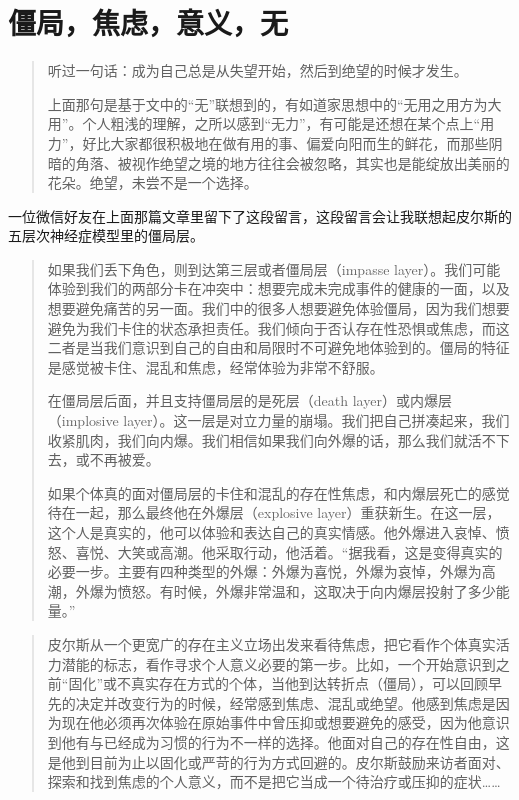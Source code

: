 \chapter{僵局，焦虑，意义，无}






\blockquote{
    听过一句话：成为自己总是从失望开始，然后到绝望的时候才发生。

    上面那句是基于文中的“无”联想到的，有如道家思想中的“无用之用方为大用”。个人粗浅的理解，之所以感到“无力”，有可能是还想在某个点上“用力”，好比大家都很积极地在做有用的事、偏爱向阳而生的鲜花，而那些阴暗的角落、被视作绝望之境的地方往往会被忽略，其实也是能绽放出美丽的花朵。绝望，未尝不是一个选择。
}


一位微信好友在上面那篇文章里留下了这段留言，这段留言会让我联想起皮尔斯的五层次神经症模型里的僵局层。

\blockquote{
如果我们丢下角色，则到达第三层或者僵局层（impasse layer）。我们可能体验到我们的两部分卡在冲突中：想要完成未完成事件的健康的一面，以及想要避免痛苦的另一面。我们中的很多人想要避免体验僵局，因为我们想要避免为我们卡住的状态承担责任。我们倾向于否认存在性恐惧或焦虑，而这二者是当我们意识到自己的自由和局限时不可避免地体验到的。僵局的特征是感觉被卡住、混乱和焦虑，经常体验为非常不舒服。

在僵局层后面，并且支持僵局层的是死层（death layer）或内爆层（implosive layer）。这一层是对立力量的崩塌。我们把自己拼凑起来，我们收紧肌肉，我们向内爆。我们相信如果我们向外爆的话，那么我们就活不下去，或不再被爱。

如果个体真的面对僵局层的卡住和混乱的存在性焦虑，和内爆层死亡的感觉待在一起，那么最终他在外爆层（explosive layer）重获新生。在这一层，这个人是真实的，他可以体验和表达自己的真实情感。他外爆进入哀悼、愤怒、喜悦、大笑或高潮。他采取行动，他活着。“据我看，这是变得真实的必要一步。主要有四种类型的外爆：外爆为喜悦，外爆为哀悼，外爆为高潮，外爆为愤怒。有时候，外爆非常温和，这取决于向内爆层投射了多少能量。”

}

\blockquote{
皮尔斯从一个更宽广的存在主义立场出发来看待焦虑，把它看作个体真实活力潜能的标志，看作寻求个人意义必要的第一步。比如，一个开始意识到之前“固化”或不真实存在方式的个体，当他到达转折点（僵局），可以回顾早先的决定并改变行为的时候，经常感到焦虑、混乱或绝望。他感到焦虑是因为现在他必须再次体验在原始事件中曾压抑或想要避免的感受，因为他意识到他有与已经成为习惯的行为不一样的选择。他面对自己的存在性自由，这是他到目前为止以固化或严苛的行为方式回避的。皮尔斯鼓励来访者面对、探索和找到焦虑的个人意义，而不是把它当成一个待治疗或压抑的症状……

}

